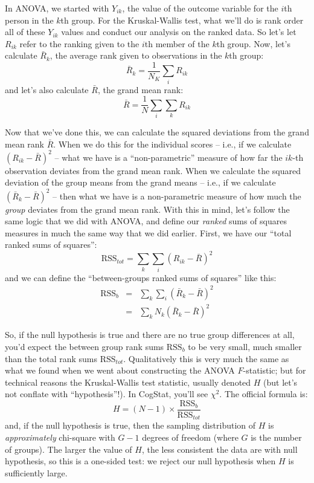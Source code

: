 \documentclass[
]{book}
\theoremstyle{definition}
\theoremstyle{definition}
\theoremstyle{definition}
\theoremstyle{definition}
\theoremstyle{remark}
\begin{document}
In ANOVA, we started with \(Y_{ik}\), the value of the outcome variable for the \(i\)th person in the \(k\)th group. For the Kruskal-Wallis test, what we'll do is rank order all of these \(Y_{ik}\) values and conduct our analysis on the ranked data. So let's let \(R_{ik}\) refer to the ranking given to the \(i\)th member of the \(k\)th group. Now, let's calculate \(\bar{R}_k\), the average rank given to observations in the \(k\)th group:
\[
\bar{R}_k = \frac{1}{N_K} \sum_{i} R_{ik}
\]
and let's also calculate \(\bar{R}\), the grand mean rank:
\[
\bar{R} = \frac{1}{N} \sum_{i} \sum_{k} R_{ik}
\]

Now that we've done this, we can calculate the squared deviations from the grand mean rank \(\bar{R}\). When we do this for the individual scores -- i.e., if we calculate \((R_{ik} - \bar{R})^2\) -- what we have is a ``non-parametric'' measure of how far the \(ik\)-th observation deviates from the grand mean rank. When we calculate the squared deviation of the group means from the grand means -- i.e., if we calculate \((\bar{R}_k - \bar{R} )^2\) -- then what we have is a non-parametric measure of how much the \emph{group} deviates from the grand mean rank. With this in mind, let's follow the same logic that we did with ANOVA, and define our \emph{ranked} sums of squares measures in much the same way that we did earlier. First, we have our ``total ranked sums of squares'':
\[
\mbox{RSS}_{tot} = \sum_k \sum_i ( R_{ik} - \bar{R} )^2
\]
and we can define the ``between-groups ranked sums of squares'' like this:
\[
\begin{array}{rcl}
\mbox{RSS}_{b} &=& \sum_k \sum_i ( \bar{R}_k  - \bar{R} )^2 \\
&=& \sum_k N_k ( \bar{R}_k  - \bar{R} )^2 
\end{array}
\]

So, if the null hypothesis is true and there are no true group differences at all, you'd expect the between group rank sums \(\mbox{RSS}_{b}\) to be very small, much smaller than the total rank sums \(\mbox{RSS}_{tot}\). Qualitatively this is very much the same as what we found when we went about constructing the ANOVA \(F\)-statistic; but for technical reasons the Kruskal-Wallis test statistic, usually denoted \(H\) (but let's not conflate with ``hypothesis''!). In CogStat, you'll see \(\chi^2\). The official formula is:
\[
H = (N - 1) \times \frac{\mbox{RSS}_b}{\mbox{RSS}_{tot}}
\]
and, if the null hypothesis is true, then the sampling distribution of \(H\) is \emph{approximately} chi-square with \(G-1\) degrees of freedom (where \(G\) is the number of groups). The larger the value of \(H\), the less consistent the data are with null hypothesis, so this is a one-sided test: we reject our null hypothesis when \(H\) is sufficiently large.
\end{document}
